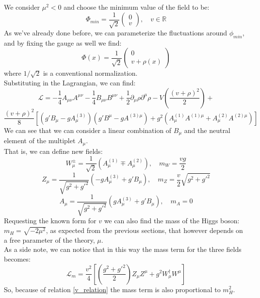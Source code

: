 We consider $\mu^2<0$ and choose the minimum value of the field to be:
\begin{equation}
    \Phi_{min} = \frac{1}{\sqrt{2}}\begin{pmatrix}
        0 \\ v
    \end{pmatrix}, \quad v \in \mathbb{R}
\end{equation}
As we've already done before, we can parameterize the fluctuations around $\phi_{min}$, and by fixing the gauge as well we find:
\begin{equation}
    \Phi(x) =\frac{1}{\sqrt{2}} \begin{pmatrix}
        0 \\ v + \rho(x)
    \end{pmatrix}
\end{equation}
where $1/\sqrt{2}$ is a conventional normalization.\\

Substituting in the Lagrangian, we can find:
\begin{equation}
    \mathcal{L} = - \frac{1}{4} A_{\mu\nu}A^{\mu\nu} -\frac{1}{4} B_{\mu\nu}B^{\mu\nu} + \frac{1}{2}\partial_{\mu}\rho\partial^{\mu}\rho -V\left(\frac{(v + \rho)^2}{2}\right) +
\end{equation}
\begin{equation*}
    \frac{(v+ \rho)^2}{8}\left[\left(g' B_{\mu} - gA_{\mu}^{(3)}\right) \left(g' B^{\mu} - g A^{(3)\mu}\right) +g^2\left(A_{\mu}^{(1)} A^{(1)\mu} + A_{\mu}^{(2)} A^{(2)\mu}  \right) \right]
\end{equation*}
We can see that we can consider a linear combination of $B_{\mu}$ and the neutral element of the multiplet $A_{\mu}$.\\
That is, we can define new fields:
\begin{equation}
    W_{\mu}^{\pm}= \frac{1}{\sqrt{2}}\left(A_{\mu}^{(1)}\mp A_{\mu}^{(2)}\right), \quad m_W = \frac{vg}{2}
\end{equation}
\begin{equation}
    Z_{\mu} = \frac{1}{\sqrt{g^2 + g'^2}}\left( - g A_{\mu} ^{(3)} + g' B_{\mu} \right), \quad m_Z = \frac{v}{2}\sqrt{g^2 + g'^2}
\end{equation}
\begin{equation}
    A_{\mu} = \frac{1}{\sqrt{g^2 + g'^2}}\left(g A_{\mu} ^{(3)} + g' B_{\mu} \right), \quad m_A = 0
\end{equation}
Requesting the known form for $v$ we can also find the mass of the Higgs boson: $m_H = \sqrt{-2\mu^2}$, as expected from the previous sections, that however depends on a free parameter of the theory, $\mu$.\\
As a side note, we can notice that in this way the mass term for the three fields becomes:
\begin{equation}
    \mathcal{L}_m = \frac{v^2}{4}\left[\left(\frac{g^2 + g'^2}{2}\right)Z_{\mu}Z^{\mu} + g^2 W_{\mu}^{\dagger}W^{\mu}\right]
\end{equation}
So, because of relation \ref{v_relation} the mass term is also proportional to $m_H^2$.
    

